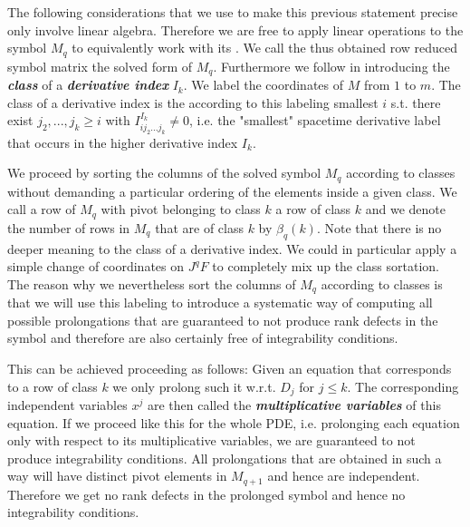 \documentclass[a4paper,12pt, DIV=14, BCOR=5mm, twoside, headsepline]{scrbook}
\begin{document}
The following considerations that we use to make this previous statement precise only involve linear algebra. Therefore we are free to apply linear operations to the symbol $M_q$ to equivalently work with its . We call the thus obtained row reduced symbol matrix the solved form of $M_q$. Furthermore we follow \cite{seiler1994analysis} in introducing the \textit{\textbf{class}} of a \textit{\textbf{derivative index}} $I_k$. We label the coordinates of $M$ from $1$ to $m$. The class of a derivative index is the according to this labeling smallest $i$ s.t. there exist $j_2,...,j_k\geq i$ with $I^{I_k}_{ij_2...j_k} \neq 0$, i.e. the "smallest" spacetime derivative label that occurs in the higher derivative index $I_k$.

We proceed by sorting the columns of the solved symbol $M_q$ according to classes without demanding a particular ordering of the elements inside a given class. We call a row of $M_q$ with pivot belonging to class $k$ a row of class $k$ and we denote the number of rows in $M_q$ that are of class $k$ by $\beta_q(k)$. Note that there is no deeper meaning to the class of a derivative index. We could in particular apply a simple change of coordinates on $J^qF$ to completely mix up the class sortation. The reason why we nevertheless sort the columns of $M_q$ according to classes is that we will use this labeling to introduce a systematic way of computing all possible prolongations that are guaranteed to not produce rank defects in the symbol and therefore are also certainly free of integrability conditions.

This can be achieved proceeding as follows:
Given an equation that corresponds to a row of class $k$ we only prolong such it w.r.t. $D_j$ for  $j \leq k$. The corresponding independent variables $x^j$ are then called the \textbf{\textit{multiplicative variables}} of this equation. If we proceed like this for the whole PDE, i.e. prolonging each equation only with respect to its multiplicative variables, we are guaranteed to not produce integrability conditions. All prolongations that are obtained in such a way will have distinct pivot elements in $M_{q+1}$ and hence are independent. Therefore we get no rank defects in the prolonged symbol and hence no integrability conditions.\\ 
\end{document}
